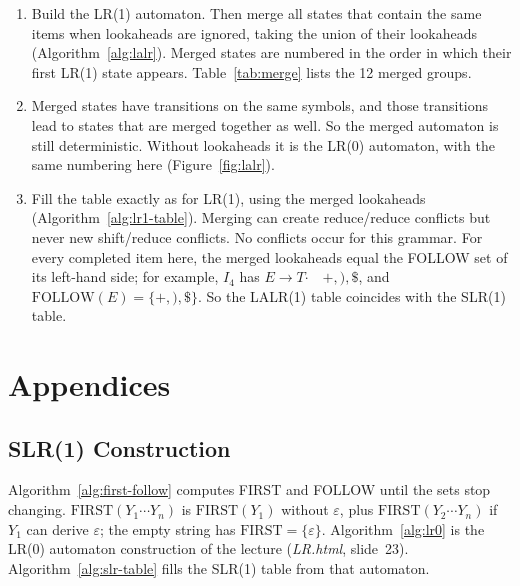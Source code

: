 \documentclass{article}
\newcommand{\dt}{\mathbin{\boldsymbol{\cdot}}}
\newcommand{\la}{\quad} %
\begin{document}
\begin{enumerate}[leftmargin=*]
  \item Build the LR(1) automaton.
    Then merge all states that contain the same items when lookaheads are ignored,
    taking the union of their lookaheads (Algorithm~\ref{alg:lalr}).
    Merged states are numbered in the order in which their first LR(1) state appears.
    Table~\ref{tab:merge} lists the 12 merged groups.
  \item Merged states have transitions on the same symbols, and those transitions
    lead to states that are merged together as well.
    So the merged automaton is still deterministic.
    Without lookaheads it is the LR(0) automaton, with the same numbering here
    (Figure~\ref{fig:lalr}).
  \item Fill the table exactly as for LR(1), using the merged lookaheads
    (Algorithm~\ref{alg:lr1-table}).
    Merging can create reduce/reduce conflicts but never new shift/reduce conflicts.
    No conflicts occur for this grammar.
    For every completed item here, the merged lookaheads equal the FOLLOW set of its left-hand side;
    for example, $I_4$ has $E \to T\dt \la +, ), \$$, and
    $\mathrm{FOLLOW}(E) = \{+, ), \$\}$.
    So the LALR(1) table coincides with the SLR(1) table.
\end{enumerate}

\clearpage
\section*{Appendices}
\setcounter{subsection}{0}
\renewcommand{\thesubsection}{Appendix \Alph{subsection}}
\makeatletter
{}
\makeatother
\renewcommand{\thealgorithm}{\Alph{subsection}.\arabic{algorithm}}

\subsection{SLR(1) Construction}

Algorithm~\ref{alg:first-follow} computes FIRST and FOLLOW until the sets stop
changing.
$\mathrm{FIRST}(Y_1 \cdots Y_n)$ is $\mathrm{FIRST}(Y_1)$ without $\varepsilon$, plus
$\mathrm{FIRST}(Y_2 \cdots Y_n)$ if $Y_1$ can derive $\varepsilon$; the empty string has
$\mathrm{FIRST} = \{\varepsilon\}$.
Algorithm~\ref{alg:lr0} is the LR(0) automaton construction of the lecture
(\textit{LR.html}, slide~23).
Algorithm~\ref{alg:slr-table} fills the SLR(1) table from that automaton.
\end{document}

